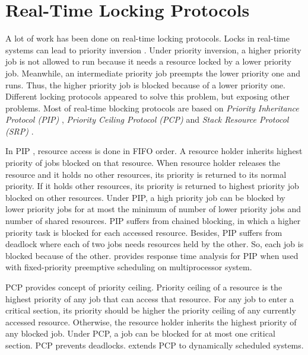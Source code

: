 \section{\label{sec:locking protocols}Real-Time Locking Protocols}
A lot of work has been done on real-time locking protocols. Locks
in real-time systems can lead to priority inversion \cite{Levine:2012:PIF:2148436.2148438,Buttazzo:2004:HRC:1027504}.
Under priority inversion, a higher priority job is not allowed to
run because it needs a resource locked by a lower priority job. Meanwhile,
an intermediate priority job preempts the lower priority one and runs.
Thus, the higher priority job is blocked because of a lower priority
one. Different locking protocols appeared to solve this problem, but
exposing other problems. Most of real-time blocking protocols are
based on \textit{Priority Inheritance Protocol (PIP)} \cite{sha1990priority,easwaran2009resource,Buttazzo:2004:HRC:1027504},
\textit{Priority Ceiling Protocol (PCP)} \cite{sha1990priority,easwaran2009resource,Buttazzo:2004:HRC:1027504,chen1990dynamic,6031129,Rajkumar:1991:SRS:532621,lakshmanan2009coordinated,rajkumar2002real}
and \textit{Stack Resource Protocol (SRP)} \cite{baker1991stack,Buttazzo:2004:HRC:1027504,990598}.

In PIP \cite{sha1990priority,Buttazzo:2004:HRC:1027504}, resource
access is done in FIFO order. A resource holder inherits highest priority
of jobs blocked on that resource. When resource holder releases the
resource and it holds no other resources, its priority is returned
to its normal priority. If it holds other resources, its priority
is returned to highest priority job blocked on other resources. Under
PIP, a high priority job can be blocked by lower priority jobs for
at most the minimum of number of lower priority jobs and number of
shared resources. PIP suffers from chained blocking, in which a higher
priority task is blocked for each accessed resource. Besides, PIP
suffers from deadlock where each of two jobs needs resources held by
the other. So, each job is blocked because of the other. \cite{easwaran2009resource}
provides response time analysis for PIP when used with fixed-priority
preemptive scheduling on multiprocessor system.

PCP \cite{sha1990priority,Buttazzo:2004:HRC:1027504,Rajkumar:1991:SRS:532621}
provides concept of priority ceiling. Priority ceiling of a resource
is the highest priority of any job that can access that resource.
For any job to enter a critical section, its priority should be higher
the priority ceiling of any currently accessed resource. Otherwise,
the resource holder inherits the highest priority of any blocked job.
Under PCP, a job can be blocked for at most one critical section.
PCP prevents deadlocks. \cite{chen1990dynamic} extends PCP to dynamically
scheduled systems.

